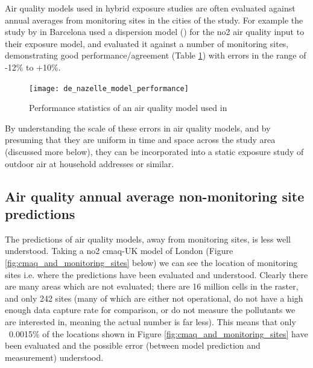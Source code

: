 Air quality models used in hybrid exposure studies are often evaluated against annual averages from monitoring sites in the cities of the study. For example the study by \cite{DeNazelle2013} in Barcelona used a dispersion model (\cite{Lao2011}) for the \gls{no2} air quality input to their exposure model, and evaluated it against a number of monitoring sites, demonstrating good performance/agreement (Table \ref{tab:fig:de_nazelle_model_performance}) with errors in the range of -12\% to +10\%.

\begin{figure}[H]
\centering
\texttt{[image: de\_nazelle\_model\_performance]}
\caption{Performance statistics of an air quality model used in \cite{DeNazelle2013}}
\label{tab:fig:de_nazelle_model_performance}
\end{figure}

By understanding the scale of these errors in air quality models, and by presuming that they are uniform in time and space across the study area (discussed more below), they can be incorporated into a static exposure study of outdoor air at household addresses or similar.

\subsection{Air quality annual average non-monitoring site predictions}
\label{air_quality_annual_average_non_site_predictions}

The predictions of air quality models, away from monitoring sites, is less well understood. Taking a \gls{no2} \gls{cmaq}-UK model of London (Figure \ref{fig:cmaq_and_monitoring_sites} below) we can see the location of monitoring sites i.e. where the predictions have been evaluated and understood. Clearly there are many areas which are not evaluated; there are 16 million cells in the raster, and only 242 sites (many of which are either not operational, do not have a high enough data capture rate for comparison, or do not measure the pollutants we are interested in, meaning the actual number is far less). This means that only ~0.0015\% of the locations shown in Figure \ref{fig:cmaq_and_monitoring_sites} have been evaluated and the possible error (between model prediction and measurement) understood.

